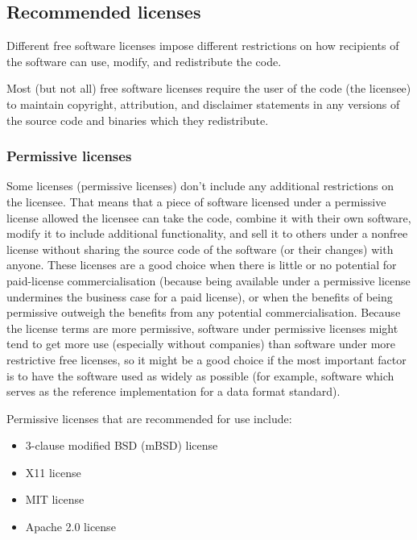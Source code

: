 \documentclass[10pt,a4paper]{article}
\begin{document}
\subsection{Recommended licenses}
\label{section:impnotes.recommended}

\par Different free software licenses impose different restrictions on how recipients 
of the software can use, modify, and redistribute the code. 

\par Most (but not all) free software licenses require the user of the code (the licensee) 
to maintain copyright, attribution, and disclaimer statements in any versions of the 
source code and binaries which they redistribute. 

\subsubsection{Permissive licenses}
\par Some licenses (permissive licenses) don't include any additional restrictions on 
the licensee. That means that a piece of software licensed under a permissive 
license allowed the licensee can take the code, combine it with their own software, 
modify it to include additional functionality, and sell it to others under a nonfree 
license without sharing the source code of the software (or their changes) with anyone. 
These licenses are a good choice when there is little or no potential for paid-license 
commercialisation (because being available under a permissive license undermines 
the business case for a paid license), or when the benefits of being permissive outweigh 
the benefits from any potential commercialisation. Because the license terms are 
more permissive, software under permissive licenses might tend to get more use 
(especially without companies) than software under more restrictive free licenses, 
so it might be a good choice if the most important factor is to have the software used 
as widely as possible (for example, software which serves as the reference 
implementation for a data format standard). 

\par Permissive licenses that are recommended for use include: 
\begin{itemize}
\item 3-clause modified BSD (mBSD) license 
\item X11 license
\item MIT license
\item Apache 2.0 license
\end{itemize}
\end{document}

